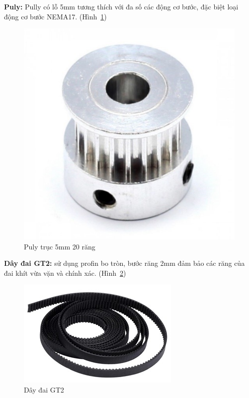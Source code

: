 \textbf{Puly:} Pully có lỗ 5mm tương thích với đa số các động cơ bước, đặc biệt loại động cơ bước NEMA17. (Hình~\ref{fig:puly})
\begin{center}
    \begin{figure}[htp]
    \begin{center}
     \includegraphics[scale=0.7]{Chapters/Chapter3/Images/Puly}
    \end{center}
    \caption{Puly trục 5mm 20 răng}
    \label{fig:puly}
    \end{figure}
\end{center}

\textbf{Dây đai GT2:} sử dụng profin bo tròn, bước răng 2mm đảm bảo các răng của đai khít vừa vặn và chính xác. (Hình~\ref{fig:daiGT2})
\begin{center}
    \begin{figure}[htp]
    \begin{center}
     \includegraphics[scale=0.7]{Chapters/Chapter3/Images/DaiGT2}
    \end{center}
    \caption{Dây đai GT2}
    \label{fig:daiGT2}
    \end{figure}
\end{center}
\clearpage
